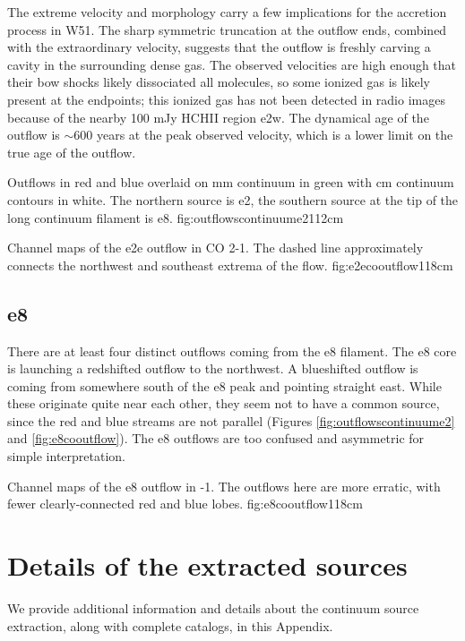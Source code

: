 \documentclass{emulateapj}
\begin{document}
The extreme velocity and morphology carry a few implications for the
accretion process in W51.  The sharp symmetric truncation at the outflow ends,
combined with the extraordinary velocity, suggests that the outflow is freshly
carving a cavity in the surrounding dense gas.  The observed velocities are
high enough that their bow shocks likely dissociated all molecules, so some
ionized gas is likely present at the endpoints; this ionized gas has not been
detected in radio images because of the nearby 100 mJy HCHII region e2w.  The
dynamical age of the outflow is $\sim600$ years at the peak observed velocity,
which is a lower limit on the true age of the outflow.


{Outflows in red and blue overlaid on mm continuum in green with cm continuum
contours in white.  The northern source is e2, the southern source at the tip
of the long continuum filament is e8.}
{fig:outflowscontinuume2}{1}{12cm}


{Channel maps of the e2e outflow in CO 2-1.  The dashed line approximately
connects the northwest and southeast extrema of the flow.}
{fig:e2ecooutflow}{1}{18cm}

\subsection{e8}
There are at least four distinct outflows coming from the e8 filament.
The e8 core is launching a redshifted outflow to the northwest.  A blueshifted
outflow is coming from somewhere south of the e8 peak and pointing straight
east.  While these originate quite near each other, they seem not to have
a common source, since the red and blue streams are not parallel (Figures
\ref{fig:outflowscontinuume2} and \ref{fig:e8cooutflow}).  The e8 outflows are too
confused and asymmetric for simple interpretation.


{Channel maps of the e8 outflow in -1.  The outflows here are more
erratic, with fewer clearly-connected red and blue lobes.}
{fig:e8cooutflow}{1}{18cm}

\section{Details of the extracted sources}
\label{sec:contsrcs}
We provide additional information and details about the continuum
source extraction, along with complete catalogs, in this Appendix.
\end{document}
